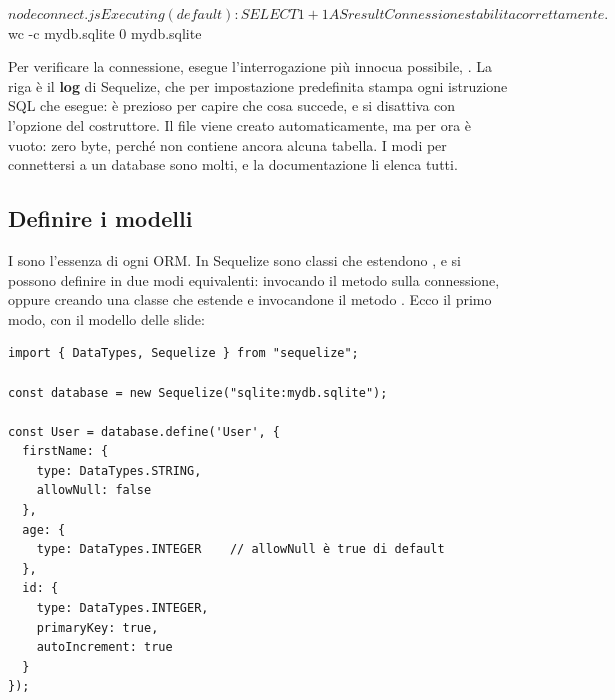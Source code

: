 \begin{console}[Terminale]
$ node connect.js
Executing (default): SELECT 1+1 AS result
Connessione stabilita correttamente.
$ wc -c mydb.sqlite
0 mydb.sqlite
\end{console}

Per verificare la connessione,  esegue l'interrogazione più
innocua possibile, . La riga  è il
\textbf{log} di Sequelize, che per impostazione predefinita stampa ogni
istruzione SQL che esegue: è prezioso per capire che cosa succede, e si
disattiva con l'opzione  del costruttore. Il file
 viene creato automaticamente, ma per ora è vuoto: zero byte,
perché non contiene ancora alcuna tabella. I modi per connettersi a un database
sono molti, e la documentazione li elenca tutti.

\subsection{Definire i modelli}

I  sono l'essenza di ogni ORM. In Sequelize sono classi che
estendono , e si possono definire in due modi equivalenti: invocando
il metodo  sulla connessione, oppure creando una classe che
estende  e invocandone il metodo . Ecco il primo modo,
con il modello delle slide:

\begin{affianco}[0.5][c]
\begin{lstlisting}[style=js, name=user.js]
import { DataTypes, Sequelize } from "sequelize";

const database = new Sequelize("sqlite:mydb.sqlite");

const User = database.define('User', {
  firstName: {
    type: DataTypes.STRING,
    allowNull: false
  },
  age: {
    type: DataTypes.INTEGER    // allowNull è true di default
  },
  id: {
    type: DataTypes.INTEGER,
    primaryKey: true,
    autoIncrement: true
  }
});
\end{lstlisting}
\risultato
\begin{immagine}
\end{immagine}
\end{affianco}

